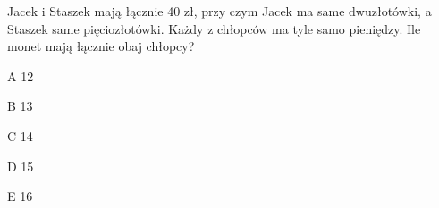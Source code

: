 \begin{tresc}
Jacek i Staszek mają łącznie 40 zł, przy czym Jacek ma same dwuzłotówki, a Staszek same pięciozłotówki. Każdy z chłopców ma tyle samo pieniędzy. Ile monet mają łącznie obaj chłopcy?
\end{tresc}
\begin{wariant}{A} 12 \end{wariant}
\begin{wariant}{B} 13 \end{wariant}
\begin{wariant}{C} 14 \end{wariant}
\begin{wariant}{D} 15 \end{wariant}
\begin{wariant}{E} 16 \end{wariant}
